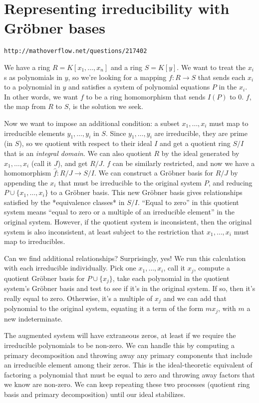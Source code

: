 \documentclass{article}
\begin{document}
\vfill\eject
\section*{Representing irreducibility with Gr\"obner bases}

\centerline{\tt http://mathoverflow.net/questions/217402}

We have a ring $R=K[x_1,\ldots,x_n]$ and a ring $S=K[y]$.  We want to
treat the $x_i$s as polynomials in $y$, so we're looking for a mapping
$f:R\to S$ that sends each $x_i$ to a polynomial in $y$ and satisfies
a system of polynomial equations $P$ in the $x_i$.  In other words, we
want $f$ to be a ring homomorphism that sends $I(P)$ to 0.  $f$, the
map from $R$ to $S$, is the solution we seek.

Now we want to impose an additional condition: a subset
$x_1,\ldots,x_i$ must map to irreducible elements $y_1,\ldots,y_i$ in
$S$.  Since $y_1,\ldots,y_i$ are irreducible, they are prime (in $S$),
so we quotient with respect to their ideal $I$ and get a quotient ring
$S/I$ that is an {\it integral domain}.  We can also quotient $R$ by the
ideal generated by $x_1,\ldots,x_i$ (call it $J$), and get $R/J$.  $f$
can be similarly restricted, and now we have a homomorphism $\hat{f}:
R/J \to S/I$.  We can construct a Gr\"obner basis for $R/J$ by appending
the $x_i$ that must be irreducible to the original system $P$, and
reducing $P \cup \{x_1,\ldots,x_i\}$ to a Gr\"obner basis.  This new
Gr\"obner basis gives relationships satisfied by the *equivalence
classes* in $S/I$.  ``Equal to zero'' in this quotient system means
``equal to zero or a multiple of an irreducible element'' in the
original system. However, if the quotient system is inconsistent, then
the original system is also inconsistent, at least subject to the
restriction that $x_1,\ldots,x_i$ must map to irreducibles.

Can we find additional relationships?  Surprisingly, yes!  We run this
calculation with each irreducible individually.  Pick one
$x_1,\ldots,x_i$, call it $x_j$, compute a quotient Gr\"obner basis for
$P \cup \{x_j\}$, take each polynomial in the quotient system's
Gr\"obner basis and test to see if it's in the original system.  If so,
then it's really equal to zero.  Otherwise, it's a multiple of $x_j$
and we can add that polynomial to the original system, equating it a
term of the form $m x_j$, with $m$ a new indeterminate.

The augmented system will have extraneous zeros, at least if we
require the irreducible polynomials to be non-zero.  We can handle
this by computing a primary decomposition and throwing away any
primary components that include an irreducible element among their
zeros.  This is the ideal-theoretic equivalent of factoring a
polynomial that must be equal to zero and throwing away factors that
we know are non-zero.  We can keep repeating these two processes
(quotient ring basis and primary decomposition) until our ideal
stabilizes.
\end{document}
